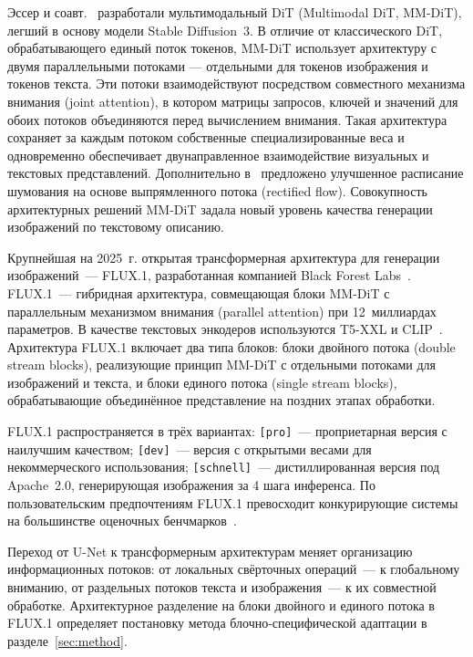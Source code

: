 Эссер и соавт.~\cite{esser2024sd3} разработали мультимодальный DiT (Multimodal DiT, MM-DiT), легший в основу модели Stable Diffusion~3. В отличие от классического DiT, обрабатывающего единый поток токенов, MM-DiT использует архитектуру с двумя параллельными потоками --- отдельными для токенов изображения и токенов текста. Эти потоки взаимодействуют посредством совместного механизма внимания (joint attention), в котором матрицы запросов, ключей и значений для обоих потоков объединяются перед вычислением внимания. Такая архитектура сохраняет за каждым потоком собственные специализированные веса и одновременно обеспечивает двунаправленное взаимодействие визуальных и текстовых представлений. Дополнительно в~\cite{esser2024sd3} предложено улучшенное расписание шумования на основе выпрямленного потока (rectified flow). Совокупность архитектурных решений MM-DiT задала новый уровень качества генерации изображений по текстовому описанию.

Крупнейшая на 2025~г. открытая трансформерная архитектура для генерации изображений~--- FLUX.1, разработанная компанией Black Forest Labs~\cite{blackforest2024flux}. FLUX.1~--- гибридная архитектура, совмещающая блоки MM-DiT с параллельным механизмом внимания (parallel attention) при 12~миллиардах параметров. В качестве текстовых энкодеров используются T5-XXL и CLIP~\cite{radford2021clip}. Архитектура FLUX.1 включает два типа блоков: блоки двойного потока (double stream blocks), реализующие принцип MM-DiT с отдельными потоками для изображений и текста, и блоки единого потока (single stream blocks), обрабатывающие объединённое представление на поздних этапах обработки.

FLUX.1 распространяется в трёх вариантах: \texttt{[pro]}~--- проприетарная версия с наилучшим качеством; \texttt{[dev]}~--- версия с открытыми весами для некоммерческого использования; \texttt{[schnell]}~--- дистиллированная версия под Apache~2.0, генерирующая изображения за 4 шага инференса. По пользовательским предпочтениям FLUX.1 превосходит конкурирующие системы на большинстве оценочных бенчмарков~\cite{blackforest2024flux}.

Переход от U-Net к трансформерным архитектурам меняет организацию информационных потоков: от локальных свёрточных операций~--- к глобальному вниманию, от раздельных потоков текста и изображения~--- к их совместной обработке. Архитектурное разделение на блоки двойного и единого потока в FLUX.1 определяет постановку метода блочно-специфической адаптации в разделе~\ref{sec:method}.



